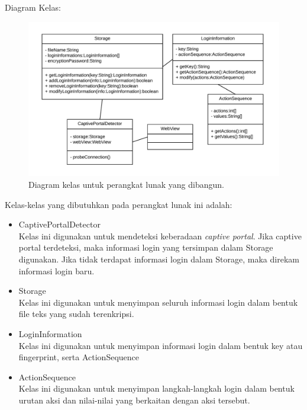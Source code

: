\documentclass[a4paper,twoside]{article}
\begin{document}
\begin{enumerate}
        Diagram Kelas:
        
        \begin{figure}[h]
            \centering
            \includegraphics[scale=0.85]{classdiagram.png}
            \caption[Diagram kelas untuk perangkat lunak yang dibangun.]{Diagram kelas untuk perangkat lunak yang dibangun.}
            \label{fig:diagramkelas}
        \end{figure}
        
        Kelas-kelas yang dibutuhkan pada perangkat lunak ini adalah:
        
        \begin{itemize}
            \item{CaptivePortalDetector\\Kelas ini digunakan untuk mendeteksi keberadaan \textit{captive portal}. Jika captive portal terdeteksi, maka informasi login yang tersimpan dalam Storage digunakan. Jika tidak terdapat informasi login dalam Storage, maka direkam informasi login baru.}
            \item{Storage\\Kelas ini digunakan untuk menyimpan seluruh informasi login dalam bentuk file teks yang sudah terenkripsi.}
            \item{LoginInformation\\Kelas ini digunakan untuk menyimpan informasi login dalam bentuk key atau fingerprint, serta ActionSequence}
            \item{ActionSequence\\Kelas ini digunakan untuk menyimpan langkah-langkah login dalam bentuk urutan aksi dan nilai-nilai yang berkaitan dengan aksi tersebut.}
        \end{itemize}


\end{enumerate}
\end{document}
